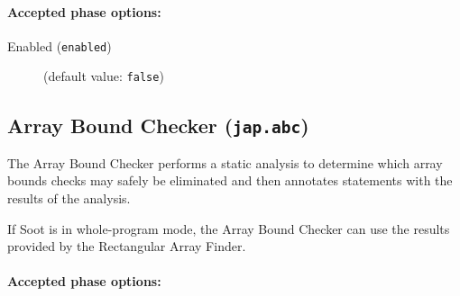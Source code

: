 \documentclass{article}
\begin{document}
\paragraph{Accepted phase options:} 

\begin{description}

\item[Enabled ({\tt enabled})]
(default value: {\tt false})






\end{description}

\subsection{Array Bound Checker ({\tt jap.abc})}


\par

The Array Bound Checker performs a static analysis to determine
which array bounds checks may safely be eliminated and then annotates
statements with the results of the analysis.

\par

If Soot is in whole-program mode, the Array Bound Checker can
use the results provided by the Rectangular Array Finder.
                        

\paragraph{Accepted phase options:} 
\end{document}
